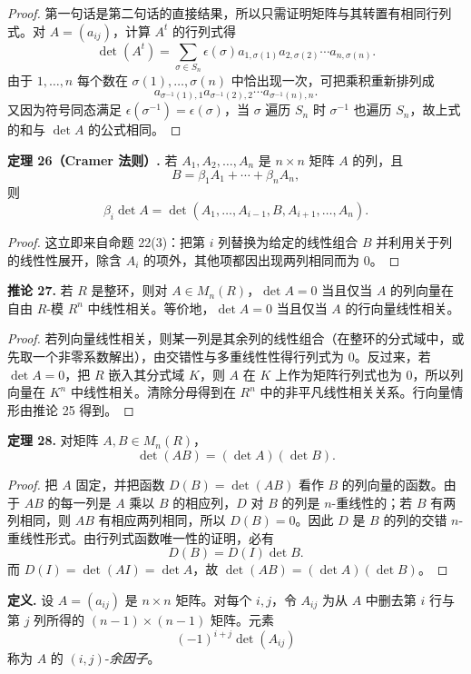 \begin{proof}
第一句话是第二句话的直接结果，所以只需证明矩阵与其转置有相同行列式。对 $A=(a_{ij})$，计算 $A^t$ 的行列式得
\[
\det(A^t)=\sum_{\sigma\in S_n}\epsilon(\sigma)
 a_{1,\sigma(1)}a_{2,\sigma(2)}\cdots a_{n,\sigma(n)}.
\]
由于 $1,
\ldots,n$ 每个数在 $\sigma(1),
\ldots,
\sigma(n)$ 中恰出现一次，可把乘积重新排列成
\[
a_{\sigma^{-1}(1),1}a_{\sigma^{-1}(2),2}\cdots a_{\sigma^{-1}(n),n}.
\]
又因为符号同态满足 $\epsilon(\sigma^{-1})=\epsilon(\sigma)$，当 $\sigma$ 遍历 $S_n$ 时 $\sigma^{-1}$ 也遍历 $S_n$，故上式的和与 $\det A$ 的公式相同。
\end{proof}

\noindent\textbf{定理 26（Cramer 法则）.} 若 $A_1,A_2,
\ldots,A_n$ 是 $n\times n$ 矩阵 $A$ 的列，且
\[
B=\beta_1A_1+\cdots+\beta_nA_n,
\]
则
\[
\beta_i\det A=
\det(A_1,
\ldots,A_{i-1},B,A_{i+1},
\ldots,A_n).
\]

\begin{proof}
这立即来自命题 22(3)：把第 $i$ 列替换为给定的线性组合 $B$ 并利用关于列的线性性展开，除含 $A_i$ 的项外，其他项都因出现两列相同而为 $0$。
\end{proof}

\noindent\textbf{推论 27.} 若 $R$ 是整环，则对 $A\in M_n(R)$，$\det A=0$ 当且仅当 $A$ 的列向量在自由 $R$-模 $R^n$ 中线性相关。等价地，$\det A=0$ 当且仅当 $A$ 的行向量线性相关。

\begin{proof}
若列向量线性相关，则某一列是其余列的线性组合（在整环的分式域中，或先取一个非零系数解出），由交错性与多重线性性得行列式为 $0$。反过来，若 $\det A=0$，把 $R$ 嵌入其分式域 $K$，则 $A$ 在 $K$ 上作为矩阵行列式也为 $0$，所以列向量在 $K^n$ 中线性相关。清除分母得到在 $R^n$ 中的非平凡线性相关关系。行向量情形由推论 25 得到。
\end{proof}

\noindent\textbf{定理 28.} 对矩阵 $A,B\in M_n(R)$，
\[
\det(AB)=(\det A)(\det B).
\]

\begin{proof}
把 $A$ 固定，并把函数 $D(B)=\det(AB)$ 看作 $B$ 的列向量的函数。由于 $AB$ 的每一列是 $A$ 乘以 $B$ 的相应列，$D$ 对 $B$ 的列是 $n$-重线性的；若 $B$ 有两列相同，则 $AB$ 有相应两列相同，所以 $D(B)=0$。因此 $D$ 是 $B$ 的列的交错 $n$-重线性形式。由行列式函数唯一性的证明，必有
\[
D(B)=D(I)\det B.
\]
而 $D(I)=\det(AI)=\det A$，故 $\det(AB)=(\det A)(\det B)$。
\end{proof}

\noindent\textbf{定义.} 设 $A=(a_{ij})$ 是 $n\times n$ 矩阵。对每个 $i,j$，令 $A_{ij}$ 为从 $A$ 中删去第 $i$ 行与第 $j$ 列所得的 $(n-1)\times(n-1)$ 矩阵。元素
\[
(-1)^{i+j}\det(A_{ij})
\]
称为 $A$ 的 $(i,j)$-\emph{余因子}。

